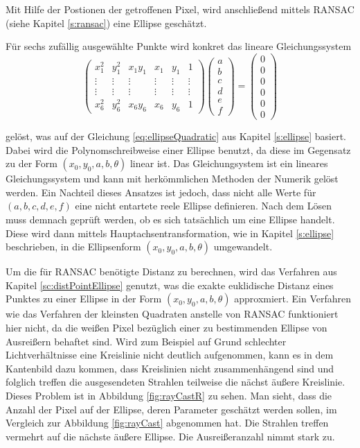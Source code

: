Mit Hilfe der Postionen der getroffenen Pixel, wird anschließend mittels RANSAC (siehe Kapitel \ref{s:ransac}) eine Ellipse geschätzt.

Für sechs zufällig ausgewählte Punkte wird konkret das lineare Gleichungssystem
\[
\begin{pmatrix}
x_1^2 & y_1^2 & x_1y_1 & x_1 & y_1 & 1\\
\vdots &\vdots & \vdots & \vdots &\vdots & \vdots\\
\vdots &\vdots & \vdots & \vdots &\vdots & \vdots\\
x_6^2 & y_6^2 & x_6y_6 & x_6 & y_6 & 1
\end{pmatrix} \begin{pmatrix}
a \\ b \\ c \\ d \\ e \\ f
\end{pmatrix} = \begin{pmatrix}
0 \\ 0 \\ 0 \\ 0 \\ 0 \\ 0
\end{pmatrix}
\]

gelöst, was auf der Gleichung \ref{eq:ellipseQuadratic} aus Kapitel \ref{s:ellipse} basiert. Dabei wird die Polynomschreibweise einer Ellipse benutzt, da diese im Gegensatz zu der Form $(x_0,y_0,a,b,\theta)$ linear ist. Das Gleichungsystem ist ein lineares Gleichungssystem und kann mit herkömmlichen Methoden der Numerik gelöst werden. Ein Nachteil dieses Ansatzes ist jedoch, dass nicht alle Werte für $(a,b,c,d,e,f)$ eine nicht entartete reele Ellipse definieren. Nach dem Lösen muss demnach geprüft werden, ob es sich tatsächlich um eine Ellipse handelt.
Diese wird dann mittels Hauptachsentransformation, wie in Kapitel \ref{s:ellipse} beschrieben, in die Ellipsenform $(x_0,y_0,a,b,\theta)$ umgewandelt.

Um die für RANSAC benötigte Distanz zu berechnen, wird das Verfahren aus Kapitel \ref{sc:distPointEllipse} genutzt, was die exakte euklidische Distanz eines Punktes zu einer Ellipse in der Form $(x_0,y_0,a,b,\theta)$ approxmiert.
Ein Verfahren wie das Verfahren der kleinsten Quadraten anstelle von RANSAC funktioniert hier nicht, da die weißen Pixel bezüglich einer zu bestimmenden Ellipse von Ausreißern behaftet sind. Wird zum Beispiel auf Grund schlechter Lichtverhältnisse eine Kreislinie nicht deutlich aufgenommen, kann es in dem Kantenbild dazu kommen, dass Kreislinien nicht zusammenhängend sind und folglich treffen die ausgesendeten Strahlen teilweise die nächst äußere Kreislinie. Dieses Problem ist in Abbildung \ref{fig:rayCastR} zu sehen. Man sieht, dass die Anzahl der Pixel auf der Ellipse, deren Parameter geschätzt werden sollen, im Vergleich zur Abbildung \ref{fig:rayCast} abgenommen hat. Die Strahlen treffen vermehrt auf die nächste äußere Ellipse. Die Ausreißeranzahl nimmt stark zu.

